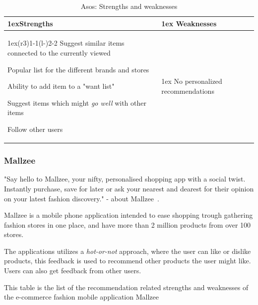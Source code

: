 \begin{table}[H]
    \centering
    \begin{tabularx}{\linewidth}{>{\parskip1ex}X@{\kern4\tabcolsep}>{\parskip1ex}X}
        \toprule
        \hfil\bfseries Strengths
        &
        \hfil\bfseries Weaknesses
        \\\cmidrule(r{3\tabcolsep}){1-1}\cmidrule(l{-\tabcolsep}){2-2}
        Suggest similar items connected to the currently viewed \par
        Popular list for the different brands and stores \par
        Ability to add item to a "want list" \par
        Suggest items which might \emph{go well} with other items \par
        Follow other users \par
        &
        No personalized recommendations \par
        \\\bottomrule
    \end{tabularx}
    \caption{Asos: Strengths and weaknesses}
    \label{table:ecommerceAsos}
\end{table}


\subsubsection{Mallzee}
\label{par:Mallzee}

"Say hello to Mallzee, your nifty, personalised shopping app with a social twist. Instantly purchase, save for later or ask your nearest and dearest for their opinion on your latest fashion discovery." - about Mallzee~\cite{mallzee}.

Mallzee is a mobile phone application intended to ease shopping trough gathering fashion stores in one place, and have more than 2 million products from over 100 stores.

The applications utilizes a \emph{hot-or-not} approach, where the user can like or dislike products, this feedback is used to recommend other products the user might like.
Users can also get feedback from other users.

This table is the list of the recommendation related strengths and weaknesses
of the e-commerce fashion mobile application Mallzee~\cite{mallzee}

